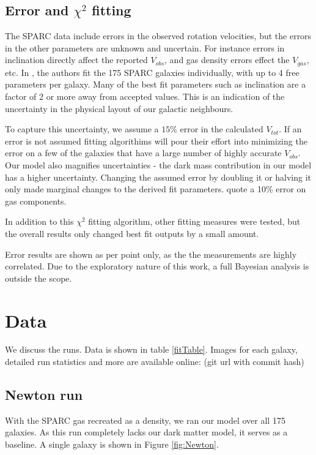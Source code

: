 \documentclass[fleqn,usenatbib]{mnras}
\begin{document}
\subsection{Error and $\chi^2$ fitting}
The SPARC data include errors in the observed rotation velocities, but the errors in the other parameters are unknown and uncertain. For instance errors in inclination directly affect the reported $V_{obs}$, and gas density errors effect the $V_{gas}$, etc. In \citep{liFittingRadialAcceleration2018} , the authors fit the 175 SPARC galaxies individually, with up to 4 free parameters per galaxy. Many of the best fit parameters such as inclination are a factor of 2 or more away from accepted values. This is an indication of the uncertainty in the physical layout of our galactic neighbours. 

To capture this uncertainty, we assume a $15\%$ error in the calculated $V_{tot}$. If an error is not assumed fitting algorithims will pour their effort into minimizing the error on a few of the galaxies that have a large number of highly accurate $V_{obs}$. Our model also magnifies uncertainties - the dark mass contribution in our model has a higher uncertainty. Changing the assumed error by doubling it or halving it only made marginal changes to the derived fit parameters. \citep{schombertStellarMasstolightRatios2022} quote a 10\% error on gas components.  

In addition to this $\chi^2$ fitting algorithm, other fitting measures were tested, but the overall results only changed best fit outputs by a small amount. 

Error results are shown as per point only, as the the measurements are highly correlated. Due to the exploratory nature of this work, a full Bayesian analysis is outside the scope. 

\section{Data} \label{sec:data}
We discuss the runs. Data is shown in table \ref{fitTable}.
Images for each galaxy, detailed run statistics and more are available online: (git url with commit hash)
\subsection{Newton run}
With the SPARC gas recreated as a density, we ran our model over all 175 galaxies. As this run completely lacks our dark matter model, it serves as a baseline. A single galaxy is shown in Figure \ref{fig:Newton}.
\end{document}
